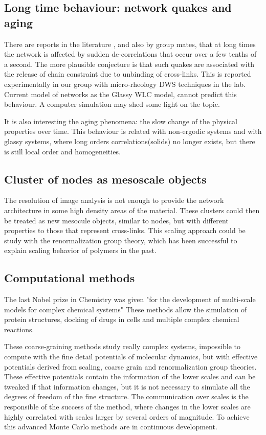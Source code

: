 
\subsection{Long time behaviour: network quakes and aging}
There are reports in the literature \citep{kajiya_slow_2013}, and also by group
mates\citep{vincent_micro-rheological_2013}, that at long times the network is affected by sudden
de-correlations that occur over a few tenths of a second. The more
plausible conjecture is that such quakes are associated with the release of
chain constraint due to unbinding of cross-links.  This is reported
experimentally in our group  with micro-rheology DWS techniques in the lab.
Current model of networks as the Glassy WLC model, cannot predict this behaviour.  A computer simulation may shed some light on the topic.

It is also interesting the aging phenomena: the slow change of the physical
properties over time. This behaviour is related with non-ergodic systems and
with glassy systems, where long orders correlations(solids) no longer exists, but there is still local order and
homogeneities.\citep{cipelletti_slow_????}

\subsection{Cluster of nodes as mesoscale objects}
The resolution of image analysis is not enough to provide the network
architecture in some high density areas of the material. These clusters could
then be treated as new mesocule objects, similar to nodes, but with different
properties to those that represent cross-links. This scaling approach could be
study with the renormalization group theory, which has been successful to explain
scaling behavior of polymers in the past.\citep{gennes_scaling_1979}

\subsection{Computational methods}  
The last Nobel prize in Chemistry was given "for the development of multi-scale
models for complex chemical systems" \citep{nobel:chemistry2013} These methods
allow the simulation of protein structures,  docking of drugs in cells and
multiple complex chemical reactions.

These coarse-graining methods study really complex
systems,\citep{de_pablo_coarse-grained_2011} impossible to compute with  the
fine detail potentials of molecular dynamics, but with effective potentials 
derived from scaling, coarse grain and renormalization group theories. These
effective potentials contain the information of the lower scales and can be
tweaked if that information changes, but it is not necessary to simulate all the
degrees of freedom of the fine structure. The communication over scales is the
responsible of the success of the method, where changes in the lower scales are
highly correlated with scales larger by several orders of magnitude. To achieve
this advanced Monte Carlo methods are in continuous development.
\citep{karayiannis_novel_2002}

